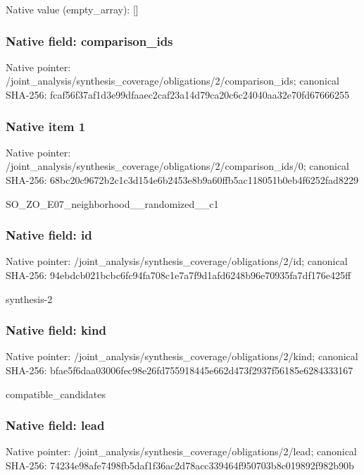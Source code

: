 \documentclass[10pt,a4paper]{article}
\begin{document}
Native value (empty\_\allowbreak{}array): []

\subsubsection{Native field: comparison\_\allowbreak{}ids}
Native pointer: /joint\_\allowbreak{}analysis/synthesis\_\allowbreak{}coverage/obligations/2/comparison\_\allowbreak{}ids; canonical SHA-256: fcaf56f37af1d3e99dfaaec2caf23a14d79ca20c6c24040aa32e70fd67666255

\subsubsection{Native item 1}
Native pointer: /joint\_\allowbreak{}analysis/synthesis\_\allowbreak{}coverage/obligations/2/comparison\_\allowbreak{}ids/0; canonical SHA-256: 68bc20c9672b2c1c3d154e6b2453e8b9a60ffb5ac118051b0eb4f6252fad8229

\begingroup\raggedright\sloppy SO\_\allowbreak{}ZO\_\allowbreak{}E07\_\allowbreak{}neighborhood\_\allowbreak{}\_\allowbreak{}randomized\_\allowbreak{}\_\allowbreak{}c1\par\endgroup

\subsubsection{Native field: id}
Native pointer: /joint\_\allowbreak{}analysis/synthesis\_\allowbreak{}coverage/obligations/2/id; canonical SHA-256: 94ebdcb021bcbc6fc94fa708c1e7a7f9d1afd6248b96e70935fa7df176e425ff

\begingroup\raggedright\sloppy synthesis-2\par\endgroup

\subsubsection{Native field: kind}
Native pointer: /joint\_\allowbreak{}analysis/synthesis\_\allowbreak{}coverage/obligations/2/kind; canonical SHA-256: bfae5f6daa03006fec98e26fd755918445e662d473f2937f56185e6284333167

\begingroup\raggedright\sloppy compatible\_\allowbreak{}candidates\par\endgroup

\subsubsection{Native field: lead}
Native pointer: /joint\_\allowbreak{}analysis/synthesis\_\allowbreak{}coverage/obligations/2/lead; canonical SHA-256: 74234e98afe7498fb5daf1f36ac2d78acc339464f950703b8c019892f982b90b
\end{document}

